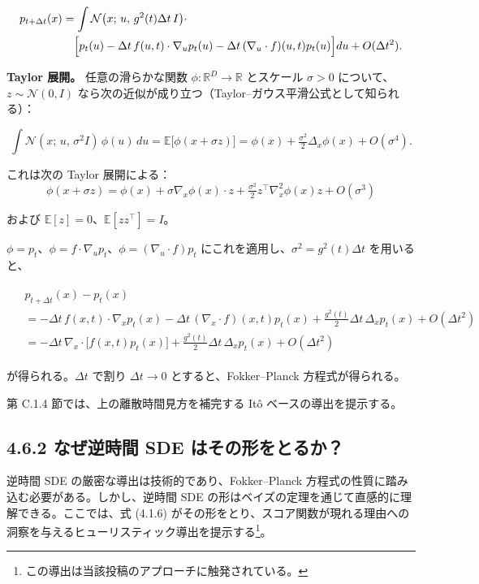 \begin{align*}
\begin{aligned}
p_{t+\Delta t}(x)
&=\int\mathcal{N}\bigl(x;\, u,\, g^2(t)\Delta t\, I\bigr)\cdot \\
&\quad\Bigl[
p_t(u)-\Delta t\, f(u,t)\cdot\nabla_u p_t(u)
-\Delta t\,(\nabla_u\cdot f)(u,t)p_t(u)
\Bigr]du
+O(\Delta t^2).
\end{aligned}
\end{align*}


\textbf{Taylor 展開。} 任意の滑らかな関数 $\phi:\mathbb{R}^D\to\mathbb{R}$ とスケール $\sigma>0$ について、$z\sim\mathcal{N}(0,I)$ なら次の近似が成り立つ（Taylor–ガウス平滑公式として知られる）：

\[
\int\mathcal{N}(x;\, u,\, \sigma^2 I)\,\phi(u)\, du
=\mathbb{E}\bigl[\phi(x+\sigma z)\bigr]
=\phi(x)+\tfrac{\sigma^2}{2}\Delta_x\phi(x)+O(\sigma^4).
\]


これは次の Taylor 展開による：
\[
\phi(x+\sigma z)=\phi(x)+\sigma\nabla_x\phi(x)\cdot z+\tfrac{\sigma^2}{2}z^\top\nabla_x^2\phi(x)z+O(\sigma^3)
\]

および $\mathbb{E}[z]=0$、$\mathbb{E}[zz^\top]=I$。

$\phi=p_t$、$\phi=f\cdot\nabla_u p_t$、$\phi=(\nabla_u\cdot f)p_t$ にこれを適用し、$\sigma^2=g^2(t)\Delta t$ を用いると、

\begin{align*}
\begin{aligned}
&p_{t+\Delta t}(x)-p_t(x) \\
&= -\Delta t\, f(x,t)\cdot\nabla_x p_t(x)
-\Delta t\,(\nabla_x\cdot f)(x,t)p_t(x)
+\tfrac{g^2(t)}{2}\Delta t\,\Delta_x p_t(x)
+O(\Delta t^2) \\
&= -\Delta t\,\nabla_x\cdot\bigl[f(x,t)p_t(x)\bigr]
+\tfrac{g^2(t)}{2}\Delta t\,\Delta_x p_t(x)
+O(\Delta t^2)
\end{aligned}
\end{align*}


が得られる。$\Delta t$ で割り $\Delta t\to 0$ とすると、Fokker–Planck 方程式が得られる。

第 C.1.4 節では、上の離散時間見方を補完する Itô ベースの導出を提示する。

\subsection*{4.6.2 なぜ逆時間 SDE はその形をとるか？}


逆時間 SDE の厳密な導出は技術的であり、Fokker–Planck 方程式の性質に踏み込む必要がある。しかし、逆時間 SDE の形はベイズの定理を通じて直感的に理解できる。ここでは、式 (4.1.6) がその形をとり、スコア関数が現れる理由への洞察を与えるヒューリスティック導出を提示する\footnote{この導出は当該投稿のアプローチに触発されている。}。

